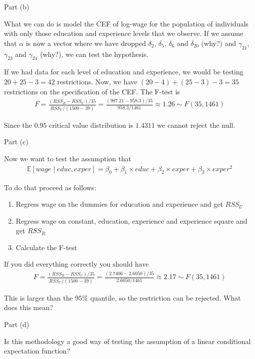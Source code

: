 \begin{frame}{Part (b)}

    What we can do is model the CEF of log-wage for the population of individuals with only those education and experience levels that we observe. If we assume that $\alpha$ is now a vector where we have dropped $\delta_2$, $\delta_5$, $\delta_6$ and $\delta_{20}$ (why?) and $\gamma_{21}$, $\gamma_{23}$ and $\gamma_{24}$ (why?), we can test the hypothesis.

    If we had data for each level of education and experience, we would be testing $20 + 25 - 3 = 42$ restrictions. Now, we have $(20 - 4) + (25 - 3) - 3 = 35$ restrictions on the specification of the CEF. The F-test is
    \begin{align*}
        F = \frac{(RSS_R - RSS_U)/35}{RSS_U/(1500 - 39)} = \frac{(987.21 - 958.3)/35}{958.3/1461} \approx 1.26 \sim F(35, 1461)
    \end{align*}

    Since the $0.95$ critical value distribution is $1.4311$ we cannot reject the null. 
\end{frame}
    

\begin{frame}{Part (c)}
    
    Now we want to test the assumption that
    \begin{align*}
        \mathbb{E}[wage \mid educ, exper] = \beta_0 + \beta_1 \times educ + \beta_2 \times exper + \beta_3 \times exper^2
    \end{align*}

    To do that proceed as follows:
    \begin{enumerate}
        \item Regress wage on the dummies for education and experience and get $RSS_U$
        \item Regress wage on constant, education, experience and experience square and get $RSS_R$
        \item Calculate the F-test
    \end{enumerate}

    If you did everything correctly you should have
    \begin{align*}
        F = \frac{(RSS_R - RSS_U)/35}{RSS_U/(1500 - 39)} = \frac{(2.7406 - 2.6050)/35}{2.6050/1461} \approx 2.17 \sim F(35, 1461)
    \end{align*}

    This is larger than the $95\%$ quantile, so the restriction can be rejected. What does this mean?
    
\end{frame}

\begin{frame}{Part (d)}
    
    Is this methodology a good way of testing the assumption of a linear conditional expectation function?
    
\end{frame}
